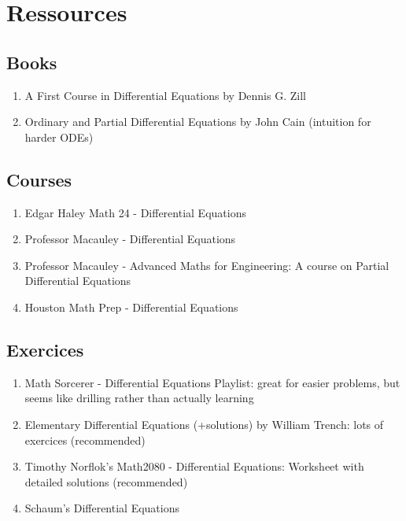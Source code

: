 \documentclass{article}
\begin{document}
\pagebreak

\section{Ressources}%
\label{sec:Ressources}

\subsection{Books}%
\label{sub:Books}

\begin{enumerate}
    \item A First Course in Differential Equations by Dennis G. Zill
    \item Ordinary and Partial Differential Equations by John Cain (intuition for harder ODEs)
\end{enumerate}

\subsection{Courses}%
\label{sub:Courses}

\begin{enumerate}
    \item Edgar Haley Math 24 - Differential Equations
    \item Professor Macauley - Differential Equations
    \item Professor Macauley - Advanced Maths for Engineering: A course
	on Partial Differential Equations
    \item Houston Math Prep - Differential Equations
\end{enumerate}

\subsection{Exercices}%
\label{sub:Exercices}

\begin{enumerate}
    \item Math Sorcerer - Differential Equations Playlist: great for easier
	problems, but seems like drilling rather than actually learning
    \item Elementary Differential Equations (+solutions) by William Trench:
	lots of exercices (recommended)
    \item Timothy Norflok's Math2080 - Differential Equations: Worksheet
	with detailed solutions (recommended)
    \item Schaum's Differential Equations
\end{enumerate}

\pagebreak
\end{document}
